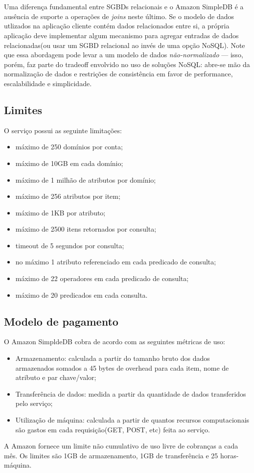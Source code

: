 \\\\ Uma diferença fundamental entre SGBDs relacionais e o Amazon SimpleDB é a ausência de suporte a operações de \textit{joins} neste último. Se o modelo de dados utlizados na aplicação cliente contém dados relacionados entre si, a própria aplicação deve implementar algum mecanismo para agregar entradas de dados relacionadas(ou usar um SGBD relacional ao invés de uma opção NoSQL). Note que essa abordagem pode levar a um modelo de dados \textit{não-normalizado} --- isso, porém, faz parte do tradeoff envolvido no uso de soluções NoSQL: abre-se mão da normalização de dados e restrições de consistência em favor de performance, escalabilidade e simplicidade.

\subsection{Limites}
O serviço possui as seguinte limitações\cite{WikiSimpleDb}:
\begin{itemize}
	\item máximo de 250 domínios por conta;
	\item máximo de 10GB em cada domínio;
	\item máximo de 1 milhão de atributos por domínio;
	\item máximo de 256 atributos por item;
	\item máximo de 1KB por atributo;
	\item máximo de 2500 itens retornados por consulta;
	\item timeout de 5 segundos por consulta;
	\item no máximo 1 atributo referenciado em cada predicado de consulta;
	\item máximo de 22 operadores em cada predicado de consulta;
	\item máximo de 20 predicados em cada consulta.
\end{itemize}

\subsection{Modelo de pagamento}
O Amazon SimpldeDB cobra de acordo com as seguintes métricas de uso:
\begin{itemize}
	\item Armazenamento: calculada a partir do tamanho bruto dos dados armazenados somados a 45 bytes de overhead para cada item, nome de atributo e par chave/valor;
	\item Transferência de dados: medida a partir da quantidade de dados transferidos pelo serviço;
	\item Utilização de máquina: calculada a partir de quantos recursos computacionais são gastos em cada requisição(GET, POST, etc) feita ao serviço.
\end{itemize}

A Amazon fornece um limite não cumulativo de uso livre de cobranças a cada mês. Os limites são 1GB de armazenamento, 1GB de transferência e 25 horas-máquina.